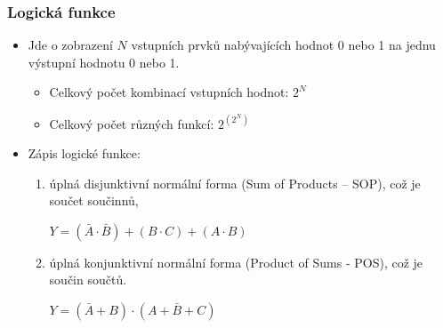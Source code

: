 	\begin{frame}
    \frametitle{Logická funkce}
		\boldmath
		
		\begin{itemize}
			\item Jde o zobrazení $N$ vstupních prvků nabývajících hodnot 0 nebo 1 na jednu výstupní hodnotu 0 nebo 1.
			
			\begin{itemize}
				\item Celkový počet kombinací vstupních hodnot: $2^N$
				\item Celkový počet různých funkcí: $2^{(2^N)}$
			\end{itemize}
			
			\vspace{5mm}
			\item Zápis logické funkce:
			
			\begin{enumerate}
				\item úplná disjunktivní normální forma (Sum of Products – SOP), což je součet součinnů,
				
				\begin{center}
					$Y = (\bar{A} \cdot \bar{B}) + (B\cdot C) + (A\cdot B)$
				\end{center}
				
				\item úplná konjunktivní normální forma (Product of Sums - POS), což je součin součtů.
				
				\begin{center}
					$Y = (\bar{A} + B) \cdot (A + \bar{B} + C)$
				\end{center}
				
			\end{enumerate}
		\end{itemize}
		
	\end{frame}
	
